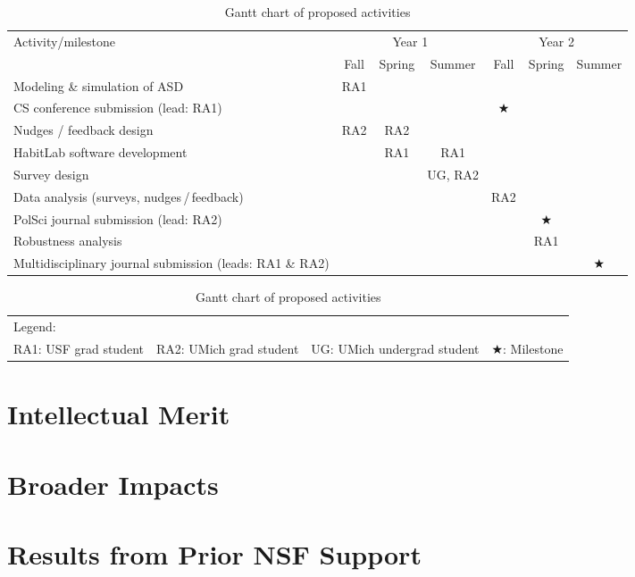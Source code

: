 \begin{table}[!ht]
    \centering
    \caption{Gantt chart of proposed activities}
    \label{tbl:timeline}

\footnotesize
\begin{tabular}{p{7.5cm}cccccc}
 \toprule
 \multirow{2}{*}{\sc Activity/milestone} & \multicolumn{3}{c}{\sc Year 1} & \multicolumn{3}{c}{\sc Year 2} \\
 \cmidrule{2-7}
 & Fall & Spring & Summer & Fall & Spring & Summer \\
 \midrule
 Modeling \& simulation of ASD & RA1 & & & & & \\
 CS conference submission (lead: RA1) & & & & $\bigstar$ & & \\
 \midrule
 Nudges / feedback design & RA2 & RA2 & & & & \\
 HabitLab software development & & RA1 & RA1 & & & \\
 Survey design & & & UG, RA2 & & & \\
 Data analysis (surveys, nudges\,/\,feedback) & & & & RA2 & & \\
 PolSci journal submission (lead: RA2) & & & & & $\bigstar$ & \\
 \midrule
 Robustness analysis & & & & & RA1 & \\
 Multidisciplinary journal submission (leads: RA1 \& RA2) & & & & & & $\bigstar$ \\
 \bottomrule
\end{tabular}

\vskip 5pt
\begin{tabular}{p{3.5cm}p{3.5cm}p{3.5cm}p{2cm}}
Legend: & & & \\
RA1: USF grad student &
RA2: UMich grad student &
UG: UMich undergrad student  &
$\bigstar$: Milestone \\
\end{tabular}
\end{table}


\section{Intellectual Merit}
\label{sec:merit}

\lipsum{}

\section{Broader Impacts}
\label{sec:broader}

\lipsum{}

\section{Results from Prior NSF Support}
\label{sec:prior}


